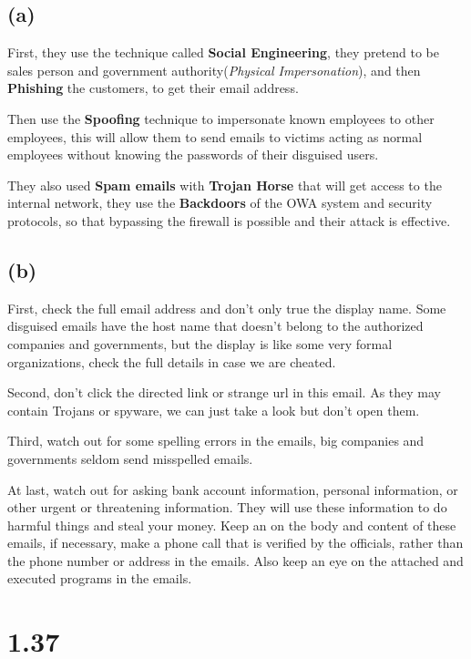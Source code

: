 \documentclass{article}
\begin{document}
\subsection{(a)}

First, they use the technique called \textbf{Social Engineering}, they pretend to be sales person and government authority(\textit{Physical
Impersonation}), and then \textbf{Phishing} the customers, to get their email address.

Then use the \textbf{Spoofing} technique to impersonate known employees to other employees, this will allow them to send emails to victims
acting as normal employees without knowing the passwords of their disguised users.

They also used \textbf{Spam emails} with \textbf{Trojan Horse} that will get access to the internal network, they use the \textbf{Backdoors}
of the OWA system and security protocols, so that bypassing the firewall is possible and their attack is effective.


\subsection{(b)}

First, check the full email address and don't only true the display name. Some disguised emails have the host name that doesn't belong to the
authorized companies and governments, but the display is like some very formal organizations, check the full details in case we are cheated.

Second, don't click the directed link or strange url in this email. As they may contain Trojans or spyware, we can just take a look but don't
open them.

Third, watch out for some spelling errors in the emails, big companies and governments seldom send misspelled emails.

At last, watch out for asking bank account information, personal information, or other urgent or threatening information. They will use these
information to do harmful things and steal your money. Keep an on the body and content of these emails, if necessary, make a phone call that is
verified by the officials, rather than the phone number or address in the emails. Also keep an eye on the attached and executed programs in the
emails.

\section{1.37}
\end{document}
